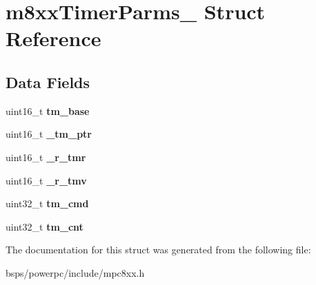 \hypertarget{structm8xxTimerParms__}{}\section{m8xx\+Timer\+Parms\+\_\+ Struct Reference}
\label{structm8xxTimerParms__}
\subsection*{Data Fields}
\begin{DoxyCompactItemize}
\item 
\mbox{\label{structm8xxTimerParms___a30a895317c0530b9287c5c320ff1928e}} 
uint16\+\_\+t {\bfseries tm\+\_\+base}
\item 
\mbox{\label{structm8xxTimerParms___aaec11f0f5a0fb8631825bca82aac2e1b}} 
uint16\+\_\+t {\bfseries \+\_\+tm\+\_\+ptr}
\item 
\mbox{\label{structm8xxTimerParms___adb3bc841be8013fc92454ceaaaa402d4}} 
uint16\+\_\+t {\bfseries \+\_\+r\+\_\+tmr}
\item 
\mbox{\label{structm8xxTimerParms___a791af09698b09d40e7cccc0a058e5ce6}} 
uint16\+\_\+t {\bfseries \+\_\+r\+\_\+tmv}
\item 
\mbox{\label{structm8xxTimerParms___a008359d04ae395ddc4a3075fa34bd9f8}} 
uint32\+\_\+t {\bfseries tm\+\_\+cmd}
\item 
\mbox{\label{structm8xxTimerParms___a15b7e8a2f1ad2bbc577b072143d2cfb1}} 
uint32\+\_\+t {\bfseries tm\+\_\+cnt}
\end{DoxyCompactItemize}


The documentation for this struct was generated from the following file\+:\begin{DoxyCompactItemize}
\item 
bsps/powerpc/include/mpc8xx.\+h\end{DoxyCompactItemize}
